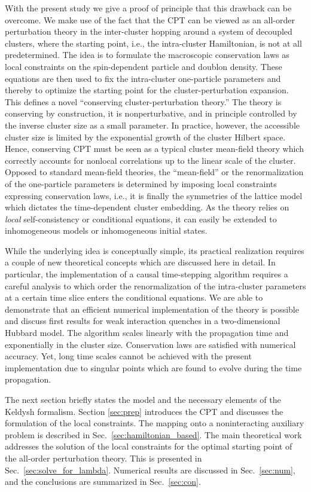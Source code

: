 \documentclass[twocolumn,prb,showpacs,aps,superscriptaddress]{revtex4}
\begin{document}
With the present study we give a proof of principle that this drawback can be
overcome.  We make use of the fact that the CPT can be viewed as an all-order
perturbation theory \cite{BP11} in the inter-cluster hopping around a system of
decoupled clusters, where the starting point, i.e., the intra-cluster
Hamiltonian, is not at all predetermined.  The idea is to formulate the
macroscopic conservation laws as local constraints on the spin-dependent
particle and doublon density.  These equations are then used to fix the
intra-cluster one-particle parameters and thereby to optimize the starting
point for the cluster-perturbation expansion.  This defines a novel
``conserving cluster-perturbation theory.'' The theory is conserving by
construction, it is nonperturbative, and in principle controlled by the inverse
cluster size as a small parameter.  In practice, however, the accessible
cluster size is limited by the exponential growth of the cluster Hilbert space.
Hence, conserving CPT must be seen as a typical cluster mean-field theory which
correctly accounts for nonlocal correlations up to the linear scale of the
cluster.  
Opposed to standard mean-field theories, the ``mean-field'' or the renormalization of the one-particle parameters is determined by imposing local constraints expressing conservation laws, i.e., it is finally the symmetries of the lattice model which dictates the time-dependent cluster embedding.  
As the theory relies on {\em local} self-consistency or conditional equations, it can easily be extended to inhomogeneous models or inhomogeneous initial states.

While the underlying idea is conceptually simple, its practical realization
requires a couple of new theoretical concepts which are discussed here in
detail.  In particular, the implementation of a causal time-stepping algorithm
requires a careful analysis to which order the renormalization of the
intra-cluster parameters at a certain time slice enters the conditional
equations.  We are able to demonstrate that an efficient numerical
implementation of the theory is possible and discuss first results for weak
interaction quenches in a two-dimensional Hubbard model.  The algorithm scales
linearly with the propagation time and exponentially in the cluster size.
Conservation laws are satisfied with numerical accuracy.  Yet, long time scales
cannot be achieved with the present implementation due to singular points which
are found to evolve during the time propagation. 

The next section briefly states the model and the necessary elements of the
Keldysh formalism.  Section \ref{sec:prep} introduces the CPT and discusses the
formulation of the local constraints.  
The mapping onto a noninteracting auxiliary problem is described in Sec.\ \ref{sec:hamiltonian_based}.  
The main theoretical work addresses the solution of the local constraints for the optimal starting point of the all-order perturbation theory. 
This is presented in Sec.\ \ref{sec:solve_for_lambda}.  
Numerical results are discussed in Sec.\ \ref{sec:num}, and the conclusions are summarized in Sec.\ \ref{sec:con}.
\end{document}
